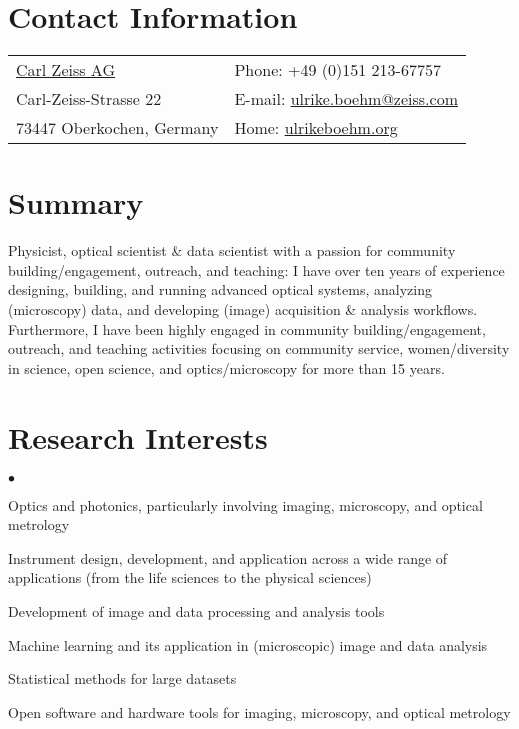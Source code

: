 \documentclass[margin,line]{res}
\newenvironment{list2}{
  \begin{list}{$\bullet$}{%
      \setlength{\itemsep}{0in}
      \setlength{\parsep}{0in} \setlength{\parskip}{0in}
      \setlength{\topsep}{0in} \setlength{\partopsep}{0in} 
      \setlength{\leftmargin}{0.2in}}}{\end{list}}
\begin{document}


\begin{resume}


\section{\sc Contact Information}
\vspace{.05in}
\begin{tabular}{@{}p{3.5in}p{4in}}
 \href{https://www.zeiss.de/}{Carl Zeiss AG}     & {Phone:} +49 (0)151 213-67757\\            
 Carl-Zeiss-Strasse 22   & { E-mail:}   \href{mailto:ulrike.boehm@zeiss.com}{ulrike.boehm@zeiss.com}  \\         
73447 Oberkochen, Germany & { Home:}  \href{http://ulrikeboehm.org/}{ulrikeboehm.org}\\           
\end{tabular}


\section{\sc Summary}
Physicist, optical scientist \& data scientist with a passion for community building/engagement, outreach, and teaching: I have over ten years of experience designing, building, and running advanced optical systems, analyzing (microscopy) data, and developing (image) acquisition \& analysis workflows. Furthermore, I have been highly engaged in community building/engagement, outreach, and teaching activities focusing on community service, women/diversity in science, open science, and optics/microscopy for more than 15 years.


\section{\sc Research Interests}
\begin{list2}
\item Optics and photonics, particularly involving imaging, microscopy, and optical metrology
\item Instrument design, development, and application across a wide range of applications (from the life sciences to the physical sciences)
\item Development of image and data processing and analysis tools
\item Machine learning and its application in (microscopic) image and data analysis
\item Statistical methods for large datasets
\item Open software and hardware tools for imaging, microscopy, and optical metrology
\end{list2}


\end{resume}
\end{document}
